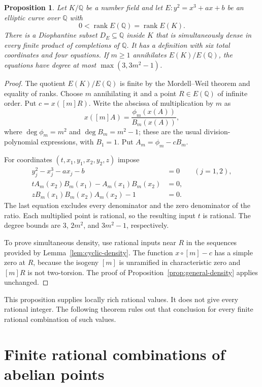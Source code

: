 \documentclass[11pt,a4paper]{article}
\newtheorem{proposition}[theorem]{Proposition}
\theoremstyle{definition}
\newcommand{\Q}{\mathbb Q}\newcommand{\Z}{\mathbb Z}
\begin{document}
\begin{proposition}\label{prop:six-coordinates}
Let $K/\Q$ be a number field and let
$E:y^2=x^3+ax+b$ be an elliptic curve over $\Q$ with
\[
              0<\operatorname{rank}E(\Q)=\operatorname{rank}E(K).
\]
There is a Diophantine subset $D_E\subseteq\Q$ inside $K$ that
is simultaneously dense in every finite product of completions of
$\Q$. It has a definition with six total coordinates and four
equations. If $m\ge1$ annihilates $E(K)/E(\Q)$, the equations have
degree at most $\max(3,3m^2-1)$.
\end{proposition}
\begin{proof}
The quotient $E(K)/E(\Q)$ is finite by the Mordell--Weil theorem
and equality of ranks. Choose $m$ annihilating it and a point
$R\in E(\Q)$ of infinite order. Put $c=x([m]R)$.
Write the abscissa of multiplication by $m$ as
\[
                 x([m]A)=\frac{\phi_m(x(A))}{B_m(x(A))},
\]
where $\deg\phi_m=m^2$ and $\deg B_m=m^2-1$; these are the
usual division-polynomial expressions, with $B_1=1$.
Put $A_m=\phi_m-cB_m$.

For coordinates $(t,x_1,y_1,x_2,y_2,z)$ impose
\begin{align*}
 y_j^2-x_j^3-ax_j-b&=0\qquad(j=1,2),\\
 tA_m(x_2)B_m(x_1)-A_m(x_1)B_m(x_2)&=0,\\
 zB_m(x_1)B_m(x_2)A_m(x_2)-1&=0.
\end{align*}
The last equation excludes every denominator and the zero
denominator of the ratio. Each multiplied point is rational, so
the resulting input $t$ is rational. The degree bounds are
$3$, $2m^2$, and $3m^2-1$, respectively.

To prove simultaneous density, use rational inputs near $R$ in
the sequences provided by Lemma~\ref{lem:cyclic-density}.
The function $x\circ[m]-c$ has a simple zero at $R$, because
the isogeny $[m]$ is unramified in characteristic zero and
$[m]R$ is not two-torsion. The proof of
Proposition~\ref{prop:general-density} applies unchanged.
\end{proof}

This proposition supplies locally rich rational values. It does not
give every rational integer. The following theorem rules out that
conclusion for every finite rational combination of such values.

\section{Finite rational combinations of abelian points}\label{sec:rational-combinations}
\end{document}

